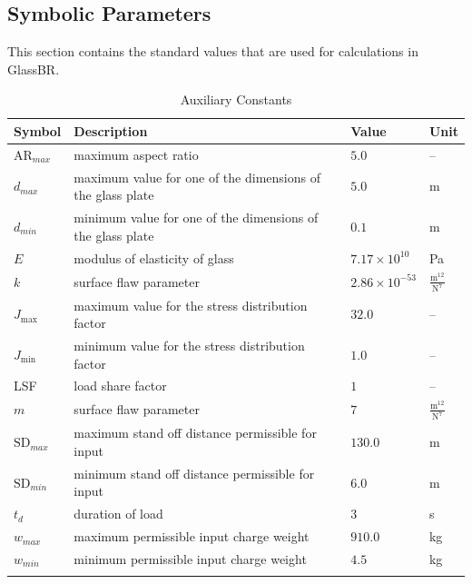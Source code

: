\documentclass[12pt]{article}
\newcommand{\progname}{GlassBR}
\begin{document}
\subsection{Symbolic Parameters}



\label{Sec:ValuofAuxiCons}
This section contains the standard values that are used for calculations in
\progname{}.

\begin{longtabu}{l X[l] l l}
	\toprule
	Symbol & Description & Value & Unit
	\\
	\midrule
	${\text{AR}_{max}}$ & maximum aspect ratio & $5.0$ & --
	\\
	${d_{max}}$ & maximum value for one of the dimensions of the glass plate & $5.0$ & m
	\\
	${d_{min}}$ & minimum value for one of the dimensions of the glass plate & $0.1$ & m
	\\
	$E$ & modulus of elasticity of glass & $7.17\times 10^{10}$ & Pa
	\\
	$k$ & surface flaw parameter & $2.86\times 10^{-53}$ & $\frac{\text{m}^{12}}{\text{N}^{7}}$
	\\
	${J_{\text{max}}}$ & maximum value for the stress distribution factor & $32.0$ & --
	\\
	${J_{\text{min}}}$ & minimum value for the stress distribution factor & $1.0$ & --
	\\
	LSF & load share factor & $1$ & --
	\\
	$m$ & surface flaw parameter & $7$ & $\frac{\text{m}^{12}}{\text{N}^{7}}$
	\\
	${\text{SD}_{max}}$ & maximum stand off distance permissible for input & $130.0$ & m
	\\
	${\text{SD}_{min}}$ & minimum stand off distance permissible for input & $6.0$ & m
	\\
	${t_{d}}$ & duration of load & $3$ & s
	\\
	${w_{max}}$ & maximum permissible input charge weight & $910.0$ & kg
	\\
	${w_{min}}$ & minimum permissible input charge weight & $4.5$ & kg
	\\
	\bottomrule
	\caption{Auxiliary Constants}
	\label{Table:AuxiCons}
\end{longtabu}



\end{document}
